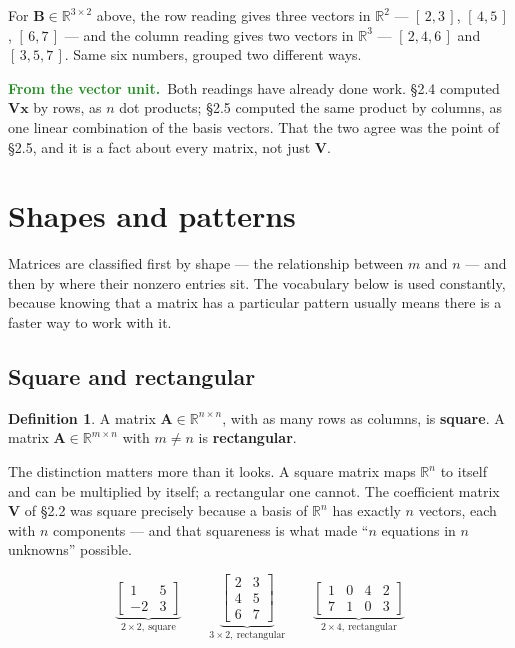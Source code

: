 \documentclass[11pt]{article}
\theoremstyle{plain}
\theoremstyle{definition}
\newtheorem{defn}{Definition}[section]
\theoremstyle{remark}
\newcommand{\lookback}{\par\smallskip\noindent
  \textbf{\sffamily\textcolor{ForestGreen}{From the vector unit.}}\ \ignorespaces}
\newcommand{\R}{\mathbb{R}}
\newcommand{\vc}[1]{\mathbf{#1}}        %
\newcommand{\mt}[1]{\mathbf{#1}}        %
\begin{document}
\noindent For $\mt{B}\in\R^{3\times2}$ above, the row reading gives three
vectors in $\R^{2}$ --- $[\,2,3\,]$, $[\,4,5\,]$, $[\,6,7\,]$ --- and the column
reading gives two vectors in $\R^{3}$ --- $[\,2,4,6\,]$ and $[\,3,5,7\,]$.
Same six numbers, grouped two different ways.

\lookback Both readings have already done work. \S2.4 computed
$\mt{V}\vc{x}$ by rows, as $n$ dot products; \S2.5 computed the same product by
columns, as one linear combination of the basis vectors. That the two agree was
the point of \S2.5, and it is a fact about every matrix, not just $\mt{V}$.

\section{Shapes and patterns}
Matrices are classified first by shape --- the relationship between $m$ and $n$
--- and then by where their nonzero entries sit. The vocabulary below is used
constantly, because knowing that a matrix has a particular pattern usually means
there is a faster way to work with it.

\subsection{Square and rectangular}
\begin{defn}
A matrix $\mt{A}\in\R^{n\times n}$, with as many rows as columns, is
\textbf{square}. A matrix $\mt{A}\in\R^{m\times n}$ with $m\neq n$ is
\textbf{rectangular}.
\end{defn}

\noindent The distinction matters more than it looks. A square matrix maps
$\R^{n}$ to itself and can be multiplied by itself; a rectangular one cannot.
The coefficient matrix $\mt{V}$ of \S2.2 was square precisely because a basis of
$\R^{n}$ has exactly $n$ vectors, each with $n$ components --- and that squareness
is what made ``$n$ equations in $n$ unknowns'' possible.

\[
  \underbrace{\begin{bmatrix}1&5\\-2&3\end{bmatrix}}_{2\times2,\ \text{square}}
  \qquad
  \underbrace{\begin{bmatrix}2&3\\4&5\\6&7\end{bmatrix}}_{3\times2,\ \text{rectangular}}
  \qquad
  \underbrace{\begin{bmatrix}1&0&4&2\\7&1&0&3\end{bmatrix}}_{2\times4,\ \text{rectangular}}
\]
\end{document}
